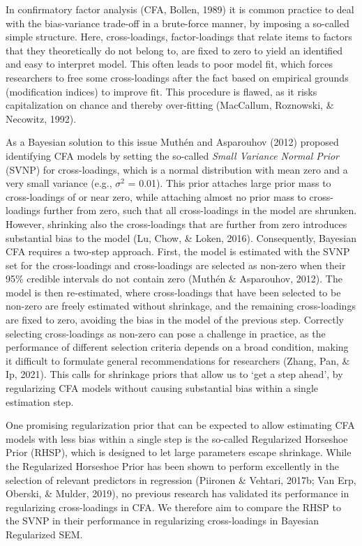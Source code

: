 \documentclass[
  man, donotrepeattitle,floatsintext]{apa6}
\begin{document}
In confirmatory factor analysis (CFA, Bollen, 1989) it is common practice to deal with the bias-variance trade-off in a brute-force manner, by imposing a so-called simple structure. Here, cross-loadings, factor-loadings that relate items to factors that they
theoretically do not belong to, are fixed to zero to yield an identified and easy to interpret model. This often leads to poor model fit, which forces researchers to free some cross-loadings after the fact based on empirical grounds (modification indices) to improve fit. This procedure is flawed, as it risks capitalization on chance and thereby over-fitting (MacCallum, Roznowski, \& Necowitz, 1992).

As a Bayesian solution to this issue Muthén and Asparouhov (2012) proposed identifying CFA models by setting the so-called \emph{Small Variance Normal Prior} (SVNP) for cross-loadings, which is a normal distribution with mean zero and a very small variance (e.g., \(\sigma^2\) = 0.01). This prior attaches large prior mass to cross-loadings of or near zero, while attaching almost no prior mass to cross-loadings further from zero, such that all cross-loadings in the model are shrunken. However, shrinking also the cross-loadings that are further from zero introduces substantial bias to the model (Lu, Chow, \& Loken, 2016). Consequently, Bayesian CFA requires a two-step approach. First, the model is estimated with the SVNP set for the cross-loadings and cross-loadings are selected as non-zero when their 95\% credible intervals do not contain zero (Muthén \& Asparouhov, 2012). The model is then re-estimated, where cross-loadings that have been selected to be non-zero are freely estimated without shrinkage, and the remaining cross-loadings are fixed to zero, avoiding the bias in the model of the previous step. Correctly selecting cross-loadings as non-zero can pose a challenge in practice, as the performance of different selection criteria depends on a broad condition, making it difficult to formulate general recommendations for researchers (Zhang, Pan, \& Ip, 2021). This calls for shrinkage priors that allow us to `get a step ahead', by regularizing CFA models without causing substantial bias within a single estimation step.

One promising regularization prior that can be expected to allow estimating CFA models with less bias within a single step is the so-called Regularized Horseshoe Prior (RHSP), which is designed to let large parameters escape shrinkage. While the Regularized Horseshoe Prior has been shown to perform excellently in the selection of relevant predictors in regression (Piironen \& Vehtari, 2017b; Van Erp, Oberski, \& Mulder, 2019), no previous research has validated its performance in regularizing cross-loadings in CFA. We therefore aim to compare the RHSP to the SVNP in their performance in regularizing cross-loadings in Bayesian Regularized SEM.
\end{document}
